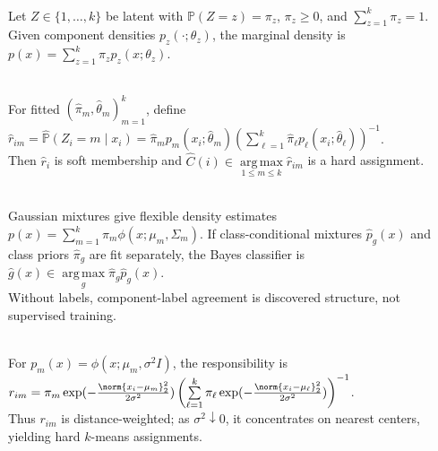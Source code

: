 \begin{definition} \label{def:sl-finite-mixture-model} \\
Let $Z\in\{1,\ldots,k\}$ be latent with $\mathbb P(Z=z)=\pi_z$, $\pi_z\geq0$, and $\sum\limits_{z=1}^k\pi_z=1$.\\
Given component densities $p_z(\cdot;\theta_z)$, the marginal density is $p(x)=\sum\limits_{z=1}^k\pi_zp_z(x;\theta_z)$.
\end{definition}

\begin{definition} \label{def:sl-mixture-responsibilities} \\
For fitted $(\widehat{\pi}_m,\widehat{\theta}_m)_{m=1}^k$, define $\widehat r_{im}=\widehat{\mathbb P}(Z_i=m\mid x_i)=\widehat{\pi}_m p_m(x_i;\widehat{\theta}_m)\left(\sum\limits_{\ell=1}^k\widehat{\pi}_\ell p_\ell(x_i;\widehat{\theta}_\ell)\right)^{-1}$.\\
Then $\widehat r_i$ is soft membership and $\widehat C(i)\in\operatorname*{arg\,max}\limits_{1\leq m\leq k}\widehat r_{im}$ is a hard assignment.
\end{definition}

\begin{remark} \label{rem:sl-mixtures-density-classification} \\
Gaussian mixtures give flexible density estimates $p(x)=\sum\limits_{m=1}^k\pi_m\phi(x;\mu_m,\Sigma_m)$. If class-conditional mixtures $\widehat p_g(x)$ and class priors $\widehat\pi_g$ are fit separately, the Bayes classifier is $\widehat g(x)\in\operatorname*{arg\,max}\limits_g\widehat\pi_g\widehat p_g(x)$.\\
Without labels, component-label agreement is discovered structure, not supervised training.
\end{remark}

\begin{remark} \label{rem:sl-gaussian-mixtures-soft-kmeans} \\
For $p_m(x)=\phi(x;\mu_m,\sigma^2I)$, the responsibility is $r_{im}=\pi_m\exp(-\frac{\norm{x_i-\mu_m}_2^2}{2\sigma^2})\left(\sum\limits_{\ell=1}^k\pi_\ell\exp(-\frac{\norm{x_i-\mu_\ell}_2^2}{2\sigma^2})\right)^{-1}$.\\
Thus $r_{im}$ is distance-weighted; as $\sigma^2\downarrow0$, it concentrates on nearest centers, yielding hard $k$-means assignments.
\end{remark}

